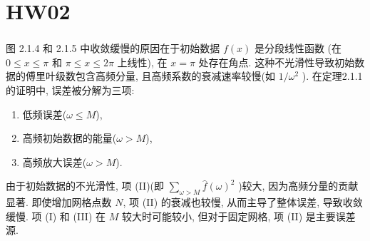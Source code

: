 \documentclass{article}
\begin{document}
    \section*{HW02}
        \setcounter{section}{2}
        \setcounter{subsection}{1}

        \subsubsection{}
            图 2.1.4 和 2.1.5 中收敛缓慢的原因在于初始数据 $f(x)$ 是分段线性函数 (在 $0 \leq x \leq \pi$ 和 $\pi \leq x \leq 2\pi$ 上线性), 在 $x = \pi$ 处存在角点. 这种不光滑性导致初始数据的傅里叶级数包含高频分量, 且高频系数的衰减速率较慢(如 $1/\omega^2$ ). 在定理2.1.1的证明中, 误差被分解为三项: 
            \begin{enumerate}[label=(\Roman*)]
                \item 低频误差($\omega \leq M$),
                \item 高频初始数据的能量($\omega > M$),
                \item 高频放大误差($\omega > M$).
            \end{enumerate}

            由于初始数据的不光滑性, 项 (II)(即 $\sum_{\omega > M} \hat{f}(\omega)^2$ )较大, 因为高频分量的贡献显著. 即使增加网格点数 $N$, 项 (II) 的衰减也较慢, 从而主导了整体误差, 导致收敛缓慢. 项 (I) 和 (III) 在 $M$ 较大时可能较小, 但对于固定网格, 项 (II) 是主要误差源.
\end{document}
